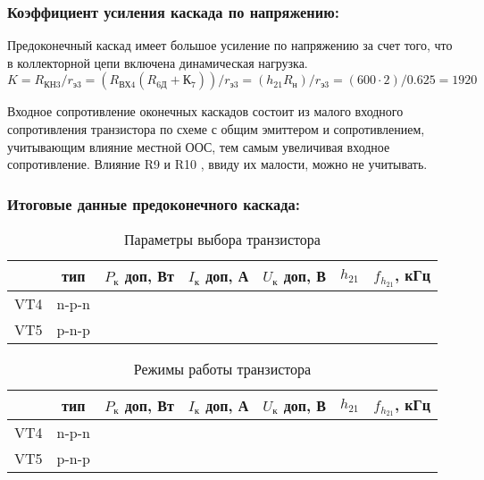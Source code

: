 \subsubsection{Коэффициент усиления каскада по напряжению:}

Предоконечный каскад имеет большое усиление по напряжению за счет того, что в коллекторной цепи включена динамическая нагрузка.
\begin{equation}
\label{eq:equation3_17}
 K = R_{\text{КН3}} / r_{\text{э3}} = (R_{\text{ВХ4}} ( R_{\text{6Д}} + К_7)) / r_{\text{э3}} = (h_{21} R_{н}) / r_{\text{э3}} = (600 \cdot 2) / 0.625 = 1920
\end{equation}

Входное сопротивление оконечных каскадов состоит из малого входного сопротивления транзистора по схеме с общим эмиттером и сопротивлением, учитывающим влияние местной ООС, тем самым увеличивая входное сопротивление.  Влияние R9 и R10 , ввиду их малости, можно не учитывать. \par

\subsubsection{Итоговые данные предоконечного каскада:}

\begin{table}[htbp]
\caption{Параметры выбора транзистора}
\begin{center}\begin{tabular}{|c|c|c|c|c|c|c|}
\hline 
  & тип & $P_{\text{к}}$ доп, Вт & $I_{\text{к}}$ доп, А & $U_{\text{к}}$ доп, В & $h_{21}$ &  $f_{h_{21}}$, кГц \\ 
\hline 
VT4 & n-p-n &   &  &  &  & \\ 
\hline 
VT5 & p-n-p &   &  &  &  &  \\ 
\hline 
\end{tabular} 
\end{center}
\end{table}

\clearpage

\begin{table}[htbp]
\caption{Режимы работы транзистора}
\begin{center}\begin{tabular}{|c|c|c|c|c|c|c|}
\hline 
  & тип & $P_{\text{к}}$ доп, Вт & $I_{\text{к}}$ доп, А & $U_{\text{к}}$ доп, В & $h_{21}$ &  $f_{h_{21}}$, кГц \\ 
\hline 
VT4 & n-p-n &   &  &  &  & \\ 
\hline 
VT5 & p-n-p &   &  &  &  &  \\ 
\hline 
\end{tabular} 
\end{center}
\end{table}